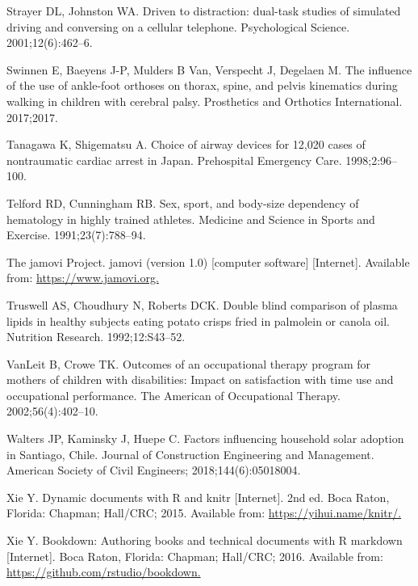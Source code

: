 \documentclass[
  11pt,
  a4paper,
  krantz2]{krantz}
\newlength{\cslhangindent}
\newenvironment{CSLReferences}[2] %
 {\begin{list}{}{%
  \setlength{\itemindent}{0pt}
  \setlength{\leftmargin}{0pt}
  \setlength{\parsep}{0pt}
  \ifodd #1
   \setlength{\leftmargin}{\cslhangindent}
   \setlength{\itemindent}{-1\cslhangindent}
  \fi
  \setlength{\itemsep}{#2\baselineskip}}}
 {\end{list}}
\begin{document}
\begin{footnotesize}
\begin{CSLReferences}{1}{0}
Strayer DL, Johnston WA. Driven to distraction: {d}ual-task studies of simulated driving and conversing on a cellular telephone. Psychological Science. 2001;12(6):462--6.

Swinnen E, Baeyens J-P, Mulders B Van, Verspecht J, Degelaen M. The influence of the use of ankle-foot orthoses on thorax, spine, and pelvis kinematics during walking in children with cerebral palsy. Prosthetics and Orthotics International. 2017;2017.

Tanagawa K, Shigematsu A. Choice of airway devices for 12,020 cases of nontraumatic cardiac arrest in {J}apan. Prehospital Emergency Care. 1998;2:96--100.

Telford RD, Cunningham RB. Sex, sport, and body-size dependency of hematology in highly trained athletes. Medicine and Science in Sports and Exercise. 1991;23(7):788--94.

The jamovi Project. {jamovi} (version 1.0) {[}computer software{]} {[}Internet{]}. Available from: \href{https://www.jamovi.org}{https://www.jamovi.org.}

Truswell AS, Choudhury N, Roberts DCK. Double blind comparison of plasma lipids in healthy subjects eating potato crisps fried in palmolein or canola oil. Nutrition Research. 1992;12:S43--52.

VanLeit B, Crowe TK. Outcomes of an occupational therapy program for mothers of children with disabilities: Impact on satisfaction with time use and occupational performance. The {A}merican of Occupational Therapy. 2002;56(4):402--10.

Walters JP, Kaminsky J, Huepe C. Factors influencing household solar adoption in {S}antiago, {C}hile. Journal of Construction Engineering and Management. American Society of Civil Engineers; 2018;144(6):05018004.

Xie Y. Dynamic documents with {R} and knitr {[}Internet{]}. 2nd ed. Boca Raton, Florida: Chapman; Hall/CRC; 2015. Available from: \href{https://yihui.name/knitr/}{https://yihui.name/knitr/.}

Xie Y. Bookdown: Authoring books and technical documents with {R} markdown {[}Internet{]}. Boca Raton, Florida: Chapman; Hall/CRC; 2016. Available from: \href{https://github.com/rstudio/bookdown}{https://github.com/rstudio/bookdown.}


\end{CSLReferences}
\end{footnotesize}
\end{document}
